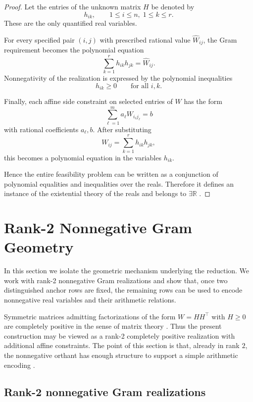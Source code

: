 \documentclass[11pt]{article}
\begin{document}
\begin{proof}
Let the entries of the unknown matrix $H$ be denoted by
\[
h_{ik}, \qquad 1\le i\le n,\; 1\le k\le r.
\]
These are the only quantified real variables.

For every specified pair $(i,j)$ with prescribed rational value
$\widehat{W}_{ij}$, the Gram requirement becomes the polynomial equation
\[
\sum_{k=1}^{r} h_{ik}h_{jk} = \widehat{W}_{ij}.
\]
Nonnegativity of the realization is expressed by the polynomial inequalities
\[
h_{ik} \ge 0
\qquad \text{for all } i,k.
\]

Finally, each affine side constraint on selected entries of $W$ has the form
\[
\sum_{\ell=1}^{m} a_\ell W_{i_\ell j_\ell} = b
\]
with rational coefficients $a_\ell,b$. After substituting
\[
W_{ij}=\sum_{k=1}^{r} h_{ik}h_{jk},
\]
this becomes a polynomial equation in the variables $h_{ik}$.

Hence the entire feasibility problem can be written as a conjunction of
polynomial equalities and inequalities over the reals. Therefore it defines
an instance of the existential theory of the reals and belongs to
$\exists\mathbb{R}$ \cite{schaefer2010complexity,cardinal2013survey}.
\end{proof}

\section{Rank-2 Nonnegative Gram Geometry}
\label{sec:geometry}

In this section we isolate the geometric mechanism underlying the reduction.
We work with rank-2 nonnegative Gram realizations and show that, once two
distinguished anchor rows are fixed, the remaining rows can be used to encode
nonnegative real variables and their arithmetic relations.

Symmetric matrices admitting factorizations of the form $W=HH^\top$ with
$H\ge 0$ are completely positive in the sense of matrix theory
\cite{berman2003cp,laurent2015cp}. Thus the present construction may be
viewed as a rank-2 completely positive realization with additional affine
constraints. The point of this section is that, already in rank $2$, the
nonnegative orthant has enough structure to support a simple arithmetic
encoding \cite{berman2003cp,bomze2018copositive,laurent2015cp}.

\subsection{Rank-2 nonnegative Gram realizations}
\end{document}
